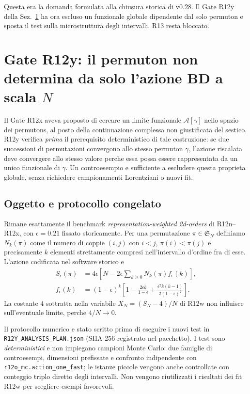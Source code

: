 \documentclass[11pt,a4paper]{article}
\begin{document}
Questa era la domanda formulata alla chiusura storica di v0.28. Il Gate R12y della Sez.~\ref{sec:r12y} ha ora escluso un funzionale globale dipendente dal solo permuton e sposta il test sulla microstruttura degli intervalli. R13 resta bloccato.

\section{Gate R12y: il permuton non determina da solo l'azione BD a scala $N$}
\label{sec:r12y}

Il Gate R12x aveva proposto di cercare un limite funzionale $\mathcal A[\gamma]$ nello spazio dei permutons, al posto della continuazione complessa non giustificata del sestico. R12y verifica \emph{prima} il prerequisito deterministico di tale costruzione: se due successioni di permutazioni convergono allo stesso permuton $\gamma$, l'azione riscalata deve convergere allo stesso valore perche essa possa essere rappresentata da un unico funzionale di $\gamma$. Un controesempio e sufficiente a escludere questa proprieta globale, senza richiedere campionamenti Lorentziani o nuovi fit.

\subsection{Oggetto e protocollo congelato}

Rimane esattamente il benchmark \emph{representation-weighted 2d-orders} di R12n--R12x, con $\epsilon=0.21$ fissato storicamente. Per una permutazione $\pi\in\mathfrak S_N$ definiamo $N_k(\pi)$ come il numero di coppie $(i,j)$ con $i<j$, $\pi(i)<\pi(j)$ e precisamente $k$ elementi strettamente compresi nell'intervallo d'ordine fra di esse. L'azione codificata nel software storico e
\begin{align}
 S_\epsilon(\pi)&=4\epsilon\left[N-2\epsilon\sum_{k\ge0}N_k(\pi)f_\epsilon(k)\right],\label{eq:r12y_action}\\
 f_\epsilon(k)&=(1-\epsilon)^k\left[1-\frac{2\epsilon k}{1-\epsilon}+\frac{\epsilon^2 k(k-1)}{2(1-\epsilon)^2}\right].\label{eq:r12y_f}
\end{align}
La costante $4$ sottratta nella variabile $X_N=(S_N-4)/N$ di R12w non influisce sull'eventuale limite, perche $4/N\to0$.

Il protocollo numerico e stato scritto prima di eseguire i nuovi test in \texttt{R12Y\_ANALYSIS\_PLAN.json} (SHA-256 registrato nel pacchetto). I test sono \emph{deterministici} e non impiegano campioni Monte Carlo: due famiglie di controesempi, dimensioni prefissate e confronto indipendente con \texttt{r12o\_mc.action\_one\_fast}; le istanze piccole vengono anche controllate con conteggio triplo diretto degli intervalli. Non vengono riutilizzati i risultati dei fit R12w per scegliere esempi favorevoli.
\end{document}

